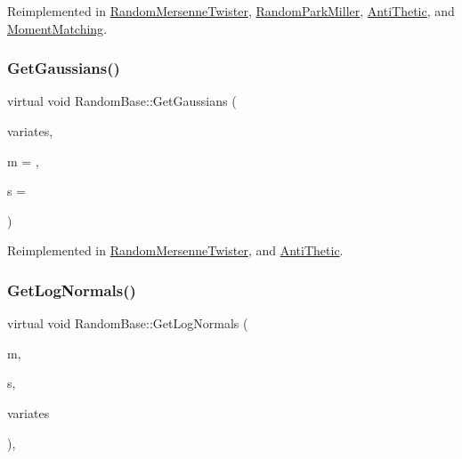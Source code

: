 Reimplemented in \hyperlink{classRandomMersenneTwister_a550207d622d23ae8229b0953868bd65d}{Random\+Mersenne\+Twister}, \hyperlink{classRandomParkMiller_a7c7f7c1079bdf8462af5bcce3787ae03}{Random\+Park\+Miller}, \hyperlink{classAntiThetic_ac680e938752f4d5b2a5ba51f5d4862e2}{Anti\+Thetic}, and \hyperlink{classMomentMatching_ab3977dfbd2a433e0874e8a2501b1b6ac}{Moment\+Matching}.

\hypertarget{classRandomBase_a8428b19f897b202363c12df1471a8d52}{}\label{classRandomBase_a8428b19f897b202363c12df1471a8d52} 
\subsubsection{\texorpdfstring{Get\+Gaussians()}{GetGaussians()}\hspace{0.1cm}{\footnotesize\ttfamily [2/2]}}
{\footnotesize\ttfamily virtual void Random\+Base\+::\+Get\+Gaussians (\begin{DoxyParamCaption}\item[{std\+::vector$<$ double $>$ \&}]{variates,  }\item[{double}]{m = {},  }\item[{double}]{s = {} }\end{DoxyParamCaption})\hspace{0.3cm}{\ttfamily [virtual]}}



Reimplemented in \hyperlink{classRandomMersenneTwister_a8c76146a5c73d6396f35fd72cbaa1f08}{Random\+Mersenne\+Twister}, and \hyperlink{classAntiThetic_a82340ce519d6dbdf75f6270193eea703}{Anti\+Thetic}.

\hypertarget{classRandomBase_a734f1712b1179fb31380e04da4a27f20}{}\label{classRandomBase_a734f1712b1179fb31380e04da4a27f20} 
\subsubsection{\texorpdfstring{Get\+Log\+Normals()}{GetLogNormals()}}
{\footnotesize\ttfamily virtual void Random\+Base\+::\+Get\+Log\+Normals (\begin{DoxyParamCaption}\item[{double}]{m,  }\item[{double}]{s,  }\item[{\hyperlink{classMJArray}{M\+J\+Array} \&}]{variates }\end{DoxyParamCaption})\hspace{0.3cm}{\ttfamily [inline]}, {\ttfamily [virtual]}}



